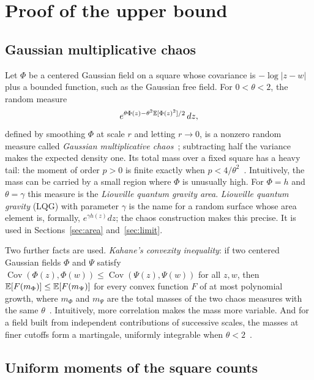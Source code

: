 \section{Proof of the upper bound}\label{sec:upper}

\subsection{Gaussian multiplicative chaos}

Let $\Phi$ be a centered Gaussian field on a square whose covariance is $-\log|z-w|$ plus a bounded
function, such as the Gaussian free field. For $0<\theta<2$, the random measure
\[
e^{\theta \Phi(z)-\theta^2\mathbb{E}[\Phi(z)^2]/2}\,dz ,
\]
defined by smoothing $\Phi$ at scale $r$ and letting $r\to0$, is a nonzero random measure called
\emph{Gaussian multiplicative chaos}~\cite{RV}; subtracting half the variance makes the expected
density one. Its total mass over a fixed square has a heavy tail: the moment of order $p>0$ is
finite exactly when $p<4/\theta^2$~\cite[Theorem~2.11]{RV}. Intuitively, the mass can be carried by
a small region where $\Phi$ is unusually high. For $\Phi=h$ and $\theta=\gamma$ this measure is the
\emph{Liouville quantum gravity area}. \emph{Liouville quantum gravity} (LQG) with parameter $\gamma$
is the name for a random surface whose area element is, formally, $e^{\gamma h(z)}dz$; the chaos
construction makes this precise. It is used in Sections~\ref{sec:area} and~\ref{sec:limit}.

Two further facts are used. \emph{Kahane's convexity inequality}: if two centered Gaussian fields
$\Phi$ and $\Psi$ satisfy $\operatorname{Cov}(\Phi(z),\Phi(w))\le\operatorname{Cov}(\Psi(z),\Psi(w))$
for all $z,w$, then $\mathbb{E}[F(m_\Phi)]\le\mathbb{E}[F(m_\Psi)]$ for every convex
function $F$ of at most polynomial growth, where $m_\Phi$ and $m_\Psi$ are the total masses of the two
chaos measures with the same $\theta$~\cite[Theorem~2.1]{RV}. Intuitively, more correlation makes
the mass more variable. And for a field built from independent contributions of successive scales,
the masses at finer cutoffs form a martingale, uniformly integrable when
$\theta<2$~\cite[Theorem~2.5]{RV}.

\subsection{Uniform moments of the square counts}

